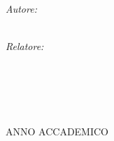 \begin{titlepage}
\begin{center}
    \begin{minipage}[t]{0.49\textwidth}
    \begin{flushleft} \large
    \emph{Autore:}\\
    \spacedlowsmallcaps{\myName}\\
    \spacedlowsmallcaps{\myMatricola}
    \end{flushleft}
    \end{minipage}
    \begin{minipage}[t]{0.49\textwidth}
    \begin{flushright} \large
    \emph{Relatore:} \\
    \spacedlowsmallcaps{\myRelator}\\
    \spacedlowsmallcaps{\myRelCourse}
    \end{flushright}
    \end{minipage}\\[0.5cm]
    \begin{minipage}[t]{0.99\textwidth}
    \end{minipage}\\

    \vfill

    ANNO ACCADEMICO \myAA

  \end{center}
\end{titlepage}
